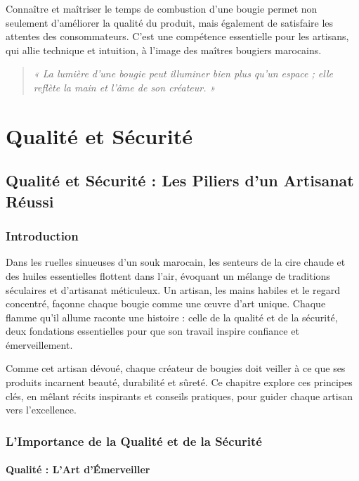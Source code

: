 \documentclass[11pt,fleqn,onecolumn,oneside]{book}
\begin{document}
Connaître et maîtriser le temps de combustion d’une bougie permet non seulement d’améliorer la qualité du produit, mais également de satisfaire les attentes des consommateurs. C’est une compétence essentielle pour les artisans, qui allie technique et intuition, à l’image des maîtres bougiers marocains.

\begin{quote}
\textit{« La lumière d’une bougie peut illuminer bien plus qu’un espace ; elle reflète la main et l’âme de son créateur. »}
\end{quote}

\part{Qualité et Sécurité}
\chapter{Qualité et Sécurité : Les Piliers d’un Artisanat Réussi}

\section{Introduction}

Dans les ruelles sinueuses d’un souk marocain, les senteurs de la cire chaude et des huiles essentielles flottent dans l’air, évoquant un mélange de traditions séculaires et d’artisanat méticuleux. Un artisan, les mains habiles et le regard concentré, façonne chaque bougie comme une œuvre d’art unique. Chaque flamme qu’il allume raconte une histoire : celle de la qualité et de la sécurité, deux fondations essentielles pour que son travail inspire confiance et émerveillement.

Comme cet artisan dévoué, chaque créateur de bougies doit veiller à ce que ses produits incarnent beauté, durabilité et sûreté. Ce chapitre explore ces principes clés, en mêlant récits inspirants et conseils pratiques, pour guider chaque artisan vers l’excellence.

\section{L’Importance de la Qualité et de la Sécurité}

\subsection*{Qualité : L’Art d’Émerveiller}
\end{document}
